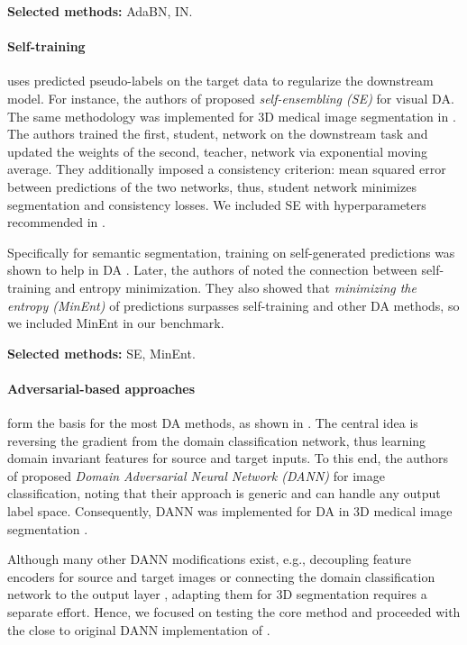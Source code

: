 \textbf{Selected methods:} AdaBN, IN.


\paragraph{Self-training} uses predicted pseudo-labels on the target data to regularize the downstream model. For instance, the authors of \cite{se} proposed \textit{self-ensembling (SE)} for visual DA. The same methodology was implemented for 3D medical image segmentation in \cite{se_medim}. The authors trained the first, student, network on the downstream task and updated the weights of the second, teacher, network via exponential moving average. They additionally imposed a consistency criterion: mean squared error between predictions of the two networks, thus, student network minimizes segmentation and consistency losses. We included SE with hyperparameters recommended in \cite{se_medim}.

Specifically for semantic segmentation, training on self-generated predictions was shown to help in DA \cite{self_training}. Later, the authors of \cite{entropy} noted the connection between self-training and entropy minimization. They also showed that \textit{minimizing the entropy (MinEnt)} of predictions surpasses self-training and other DA methods, so we included MinEnt in our benchmark.

\textbf{Selected methods:} SE, MinEnt.


\paragraph{Adversarial-based approaches} form the basis for the most DA methods, as shown in \cite{uda_segm_review_2020}. The central idea is reversing the gradient from the domain classification network, thus learning domain invariant features for source and target inputs. To this end, the authors of \cite{dann} proposed \textit{Domain Adversarial Neural Network (DANN)} for image classification, noting that their approach is generic and can handle any output label space. Consequently, DANN was implemented for DA in 3D medical image segmentation \cite{dann_medim}.

Although many other DANN modifications exist, e.g., decoupling feature encoders for source and target images \cite{adda} or connecting the domain classification network to the output layer \cite{tsai2018learning}, adapting them for 3D segmentation requires a separate effort. Hence, we focused on testing the core method and proceeded with the close to original DANN implementation of \cite{dann_medim}.

